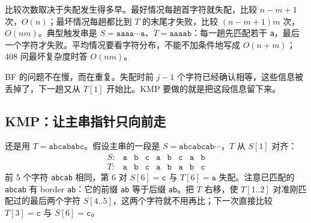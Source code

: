 比较次数取决于失配发生得多早。最好情况每趟首字符就失配，比较 $n-m+1$ 次，$O(n)$；最坏情况每趟都比到 $T$ 的末尾才失败，比较 $(n-m+1)m$ 次，$O(nm)$。典型触发串是 $S=\texttt{aaaa}\cdots\texttt{a}$、$T=\texttt{aaaab}$：每一趟先匹配若干 \texttt{a}，最后一个字符才失败。平均情况要看字符分布，不能不加条件地写成 $O(n+m)$；408 问最坏复杂度时答 $O(nm)$。

BF 的问题不在慢，而在重复。失配时前 $j-1$ 个字符已经确认相等，这些信息被丢掉了，下一趟又从 $T[1]$ 开始比。KMP 要做的就是把这段信息留下来。

\subsection{KMP：让主串指针只向前走}

还是用 $T=\texttt{abcababc}$。假设主串的一段是 $S=\texttt{abcabcab}\cdots$，$T$ 从 $S[1]$ 对齐：
\[
\begin{array}{rcccccccc}
S: & \texttt{a} & \texttt{b} & \texttt{c} & \texttt{a} & \texttt{b} & \texttt{c} & \texttt{a} & \texttt{b}\\
T: & \texttt{a} & \texttt{b} & \texttt{c} & \texttt{a} & \texttt{b} & \texttt{a} & \texttt{b} & \texttt{c}
\end{array}
\]
前 5 个字符 \texttt{abcab} 相同，第 6 对 $S[6]=\texttt{c}$ 与 $T[6]=\texttt{a}$ 失配。注意已匹配的 \texttt{abcab} 有 border \texttt{ab}：它的前缀 \texttt{ab} 等于后缀 \texttt{ab}。把 $T$ 右移，使 $T[1..2]$ 对准刚匹配过的最后两个字符 $S[4..5]$，这两个字符就不用再比；下一次直接比较 $T[3]=\texttt{c}$ 与 $S[6]=\texttt{c}$。


